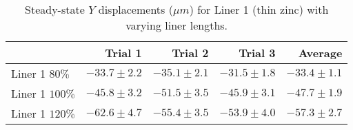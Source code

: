 \begin{table}[htbp!]
\centering
\begin{tabular}{lrrrr}
\toprule
  & Trial 1 & Trial 2 & Trial 3 & Average \\
\midrule
 Liner 1 $80\%$ & $-33.7 \pm 2.2$ & $-35.1 \pm 2.1$ & $-31.5 \pm 1.8$ & $-33.4 \pm 1.1$ \\
 Liner 1 $100\%$ & $-45.8 \pm 3.2$ & $-51.5 \pm 3.5$ & $-45.9 \pm 3.1$ & $-47.7 \pm 1.9$ \\
 Liner 1 $120\%$ & $-62.6 \pm 4.7$ & $-55.4 \pm 3.5$ & $-53.9 \pm 4.0$ & $-57.3 \pm 2.7$ \\
\bottomrule
\end{tabular}
\caption{Steady-state $Y$ displacements ($\mu m$) for Liner 1 (thin zinc) with varying liner lengths.}
\label{fig:liner_1_results_table}
\end{table}
